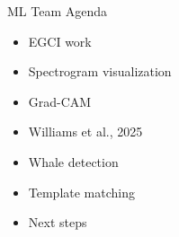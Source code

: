 




\begin{frame}{ML Team Agenda}
    \begin{itemize}
        \item EGCI work
        \item Spectrogram visualization
        \item Grad-CAM
        \item Williams et al., 2025
        \item Whale detection
        \item Template matching
        \item Next steps
    \end{itemize}
\end{frame}

